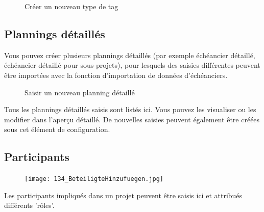 \begin{figure}[H]
\caption{Créer un nouveau type de tag}
\end{figure}

\subsection{Plannings détaillés}

Vous pouvez créer plusieurs plannings détaillés (par exemple échéancier détaillé, échéancier détaillé pour sous-projets), pour lesquels des saisies différentes peuvent être importées avec la fonction d'importation de données d'échéanciers.

\begin{figure}[H]
\caption{Saisir un nouveau planning détaillé}
\end{figure}

Tous les plannings détaillés saisis sont listés ici. Vous pouvez les visualiser ou les modifier dans l'aperçu détaillé. De nouvelles saisies peuvent également être créées sous cet élément de configuration.

\subsection{Participants}

\begin{figure}
\vspace{-25pt}
\texttt{[image: 134\_BeteiligteHinzufuegen.jpg]}
\end{figure}

Les participants impliqués dans un projet peuvent être saisis ici et attribués différents 'rôles'.

